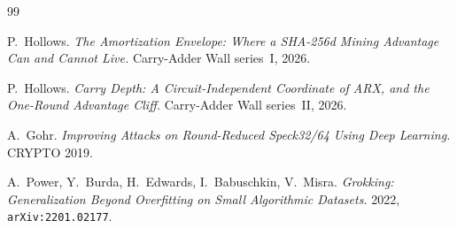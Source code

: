 \documentclass[11pt]{article}
\begin{document}
\begin{thebibliography}{99}

P.~Hollows.
\emph{The Amortization Envelope: Where a SHA-256d Mining Advantage Can and
Cannot Live.}
Carry-Adder Wall series~I, 2026.

P.~Hollows.
\emph{Carry Depth: A Circuit-Independent Coordinate of ARX, and the
One-Round Advantage Cliff.}
Carry-Adder Wall series~II, 2026.

A.~Gohr.
\emph{Improving Attacks on Round-Reduced Speck32/64 Using Deep Learning.}
CRYPTO 2019.

A.~Power, Y.~Burda, H.~Edwards, I.~Babuschkin, V.~Misra.
\emph{Grokking: Generalization Beyond Overfitting on Small Algorithmic
Datasets.}
2022, \texttt{arXiv:2201.02177}.

\end{thebibliography}
\end{document}
